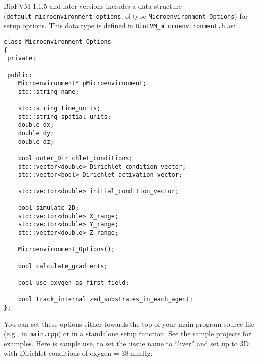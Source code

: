 \documentclass[12pt]{article}
\begin{document}
BioFVM 1.1.5 and later versions includes a data structure \hfill \newline 
(\verb+default_microenvironment_options+, of type 
\verb+Microenvironment_Options+) for setup options. 
This data type is defined in \verb+BioFVM_microenvironment.h+ as: 
\begin{verbatim}
class Microenvironment_Options
{
 private:
 
 public: 
    Microenvironment* pMicroenvironment;
    std::string name; 
 
    std::string time_units; 
    std::string spatial_units; 
    double dx;
    double dy; 
    double dz; 
    
    bool outer_Dirichlet_conditions; 
    std::vector<double> Dirichlet_condition_vector; 
    std::vector<bool> Dirichlet_activation_vector; 

    std::vector<double> initial_condition_vector; 

    bool simulate_2D; 
    std::vector<double> X_range; 
    std::vector<double> Y_range; 
    std::vector<double> Z_range; 
    
    Microenvironment_Options(); 
    
    bool calculate_gradients; 
    
    bool use_oxygen_as_first_field;
    
    bool track_internalized_substrates_in_each_agent; 	
};
\end{verbatim}

You can set these options either towards the top of your main program source 
file (e.g., in \verb+main.cpp+) or in a standalone setup function. See 
the sample projects for examples. Here is sample use, to set the tissue name to 
``liver'' and set up to 3D with Dirichlet conditions of oxygen = 38 mmHg: 
\end{document}
